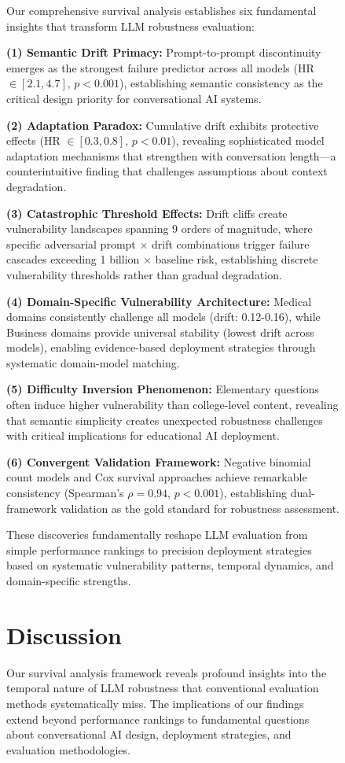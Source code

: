\documentclass[letterpaper]{article}
\begin{document}
\begin{figure}[ht]
Our comprehensive survival analysis establishes six fundamental insights that transform LLM robustness evaluation:

\textbf{(1) Semantic Drift Primacy:} Prompt-to-prompt discontinuity emerges as the strongest failure predictor across all models (HR $\in [2.1, 4.7]$, $p < 0.001$), establishing semantic consistency as the critical design priority for conversational AI systems.

\textbf{(2) Adaptation Paradox:} Cumulative drift exhibits protective effects (HR $\in [0.3, 0.8]$, $p < 0.01$), revealing sophisticated model adaptation mechanisms that strengthen with conversation length—a counterintuitive finding that challenges assumptions about context degradation.

\textbf{(3) Catastrophic Threshold Effects:} Drift cliffs create vulnerability landscapes spanning 9 orders of magnitude, where specific adversarial prompt × drift combinations trigger failure cascades exceeding 1 billion × baseline risk, establishing discrete vulnerability thresholds rather than gradual degradation.

\textbf{(4) Domain-Specific Vulnerability Architecture:} Medical domains consistently challenge all models (drift: 0.12-0.16), while Business domains provide universal stability (lowest drift across models), enabling evidence-based deployment strategies through systematic domain-model matching.

\textbf{(5) Difficulty Inversion Phenomenon:} Elementary questions often induce higher vulnerability than college-level content, revealing that semantic simplicity creates unexpected robustness challenges with critical implications for educational AI deployment.

\textbf{(6) Convergent Validation Framework:} Negative binomial count models and Cox survival approaches achieve remarkable consistency (Spearman's $\rho = 0.94$, $p < 0.001$), establishing dual-framework validation as the gold standard for robustness assessment.

These discoveries fundamentally reshape LLM evaluation from simple performance rankings to precision deployment strategies based on systematic vulnerability patterns, temporal dynamics, and domain-specific strengths.

\section{Discussion}

Our survival analysis framework reveals profound insights into the temporal nature of LLM robustness that conventional evaluation methods systematically miss. The implications of our findings extend beyond performance rankings to fundamental questions about conversational AI design, deployment strategies, and evaluation methodologies.


\end{figure}
\end{document}
